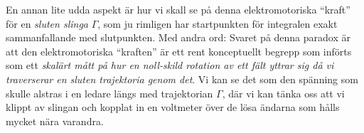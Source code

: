 En annan lite udda aspekt {\"a}r hur vi skall se p{\aa} denna elektromotoriska
``kraft'' f{\"o}r en {\it sluten slinga} $\Gamma$, som ju rimligen har
startpunkten f{\"o}r integralen exakt sammanfallande med slutpunkten.
Med andra ord:
\noindent
{}
Svaret p{\aa} denna paradox {\"a}r att den elektromotoriska ``kraften'' {\"a}r
ett rent konceptuellt begrepp som inf{\"o}rts som ett {\it skal{\"a}rt m{\aa}tt
p{\aa} hur en noll-skild rotation av ett f{\"a}lt yttrar sig d{\aa} vi
traverserar en sluten trajektoria genom det}.
Vi kan se det som den sp{\"a}nning som skulle alstras i en ledare l{\"a}ngs med
trajektorian $\Gamma$, d{\"a}r vi kan t{\"a}nka oss att vi klippt av slingan
och kopplat in en voltmeter {\"o}ver de l{\"o}sa {\"a}ndarna som h{\aa}lls
mycket n{\"a}ra varandra.
\vfill\eject

